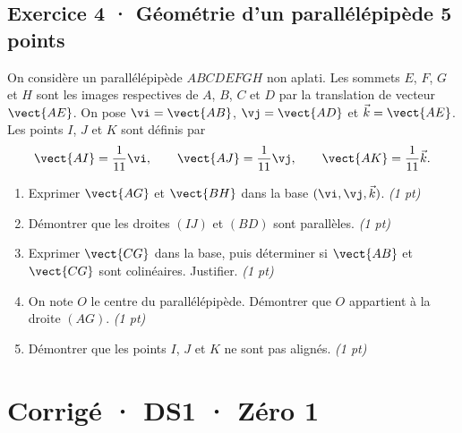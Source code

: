 \subsection*{Exercice 4 · Géométrie d'un parallélépipède \hfill 5 points}On considère un parallélépipède $ABCDEFGH$ non aplati. Les sommets $E$, $F$, $G$ et $H$ sont les images respectives de $A$, $B$, $C$ et $D$ par la translation de vecteur $\vect{AE}$.
On pose $\vi=\vect{AB}$, $\vj=\vect{AD}$ et $\vec k=\vect{AE}$.
Les points $I$, $J$ et $K$ sont définis par
\[\vect{AI}=\frac1{11}\vi,\qquad\vect{AJ}=\frac1{11}\vj,\qquad\vect{AK}=\frac1{11}\vec k.\]

\begin{enumerate}

\item Exprimer $\vect{AG}$ et $\vect{BH}$ dans la base $(\vi,\vj,\vec k)$. \hfill\textit{(1 pt)}

\item Démontrer que les droites $(IJ)$ et $(BD)$ sont parallèles. \hfill\textit{(1 pt)}

\item Exprimer $\vect{CG}$ dans la base, puis déterminer si $\vect{AB}$ et $\vect{CG}$ sont colinéaires. Justifier. \hfill\textit{(1 pt)}

\item On note $O$ le centre du parallélépipède. Démontrer que $O$ appartient à la droite $(AG)$. \hfill\textit{(1 pt)}

\item Démontrer que les points $I$, $J$ et $K$ ne sont pas alignés. \hfill\textit{(1 pt)}

\end{enumerate}

\ifprof\clearpage

\section*{Corrigé · DS1 · Zéro 1}\label{cor:1-1}

